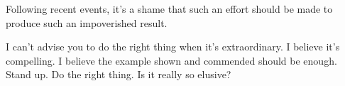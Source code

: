 

Following recent events, it's a shame that such an effort should be
made to produce such an impoverished result.

I can't advise you to do the right thing when it's extraordinary.  I
believe it's compelling.  I believe the example shown and commended
should be enough.  Stand up.  Do the right thing.  Is it really so
elusive?

\bye
